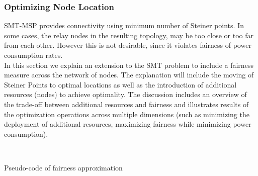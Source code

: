 \subsubsection{Optimizing Node Location}\label{OptimizingNodeLocation}
SMT-MSP provides connectivity using minimum number of Steiner points. In some cases, the relay nodes in the resulting topology, may be too close or too far from each other. However this is not desirable, since it violates fairness of power consumption rates.  \\

In this section we explain an extension to the SMT problem to include a fairness measure across the network of nodes.
The explanation will include the moving of Steiner Points to optimal locations as well as the introduction of additional resources (nodes) to achieve optimality. The discussion includes an overview of the trade-off between additional resources and  fairness and illustrates results of the optimization operations across multiple dimensions (such as minimizing the deployment of additional resources, maximizing fairness while minimizing power consumption).\\ 


\begin{algorithm}[ht]

\dontprintsemicolon
{}
\\
\caption{Pseudo-code of fairness approximation}
\label{MakeFair}
\end{algorithm}


